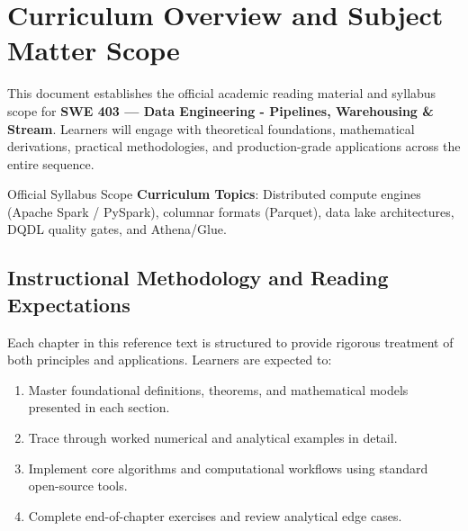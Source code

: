 \section{Curriculum Overview and Subject Matter Scope}

This document establishes the official academic reading material and syllabus scope for \textbf{SWE 403 --- Data Engineering - Pipelines, Warehousing \& Stream}. Learners will engage with theoretical foundations, mathematical derivations, practical methodologies, and production-grade applications across the entire sequence.

\begin{InsightBox}{Official Syllabus Scope}
  \textbf{Curriculum Topics}: Distributed compute engines (Apache Spark / PySpark), columnar formats (Parquet), data lake architectures, DQDL quality gates, and Athena/Glue.
\end{InsightBox}

\subsection{Instructional Methodology and Reading Expectations}

Each chapter in this reference text is structured to provide rigorous treatment of both principles and applications. Learners are expected to:
\begin{enumerate}
  \item Master foundational definitions, theorems, and mathematical models presented in each section.
  \item Trace through worked numerical and analytical examples in detail.
  \item Implement core algorithms and computational workflows using standard open-source tools.
  \item Complete end-of-chapter exercises and review analytical edge cases.
\end{enumerate}

